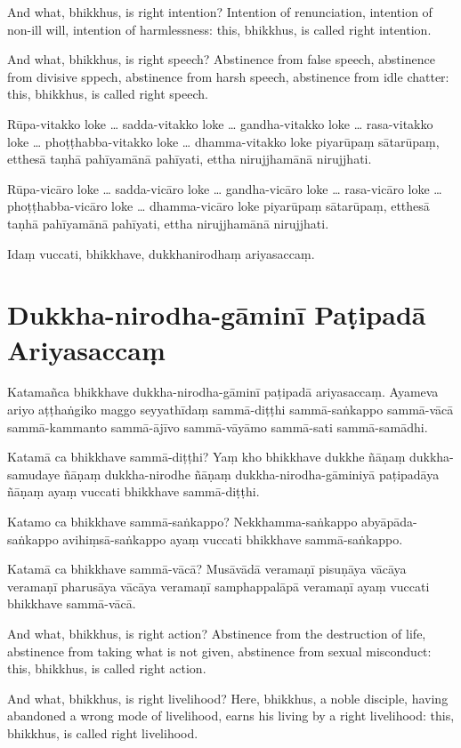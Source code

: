 And what, bhikkhus, is right intention? Intention of renunciation, intention of
non-ill will, intention of harmlessness: this, bhikkhus, is called right
intention.

And what, bhikkhus, is right speech? Abstinence from false speech, abstinence
from divisive sppech, abstinence from harsh speech, abstinence from idle
chatter: this, bhikkhus, is called right speech.

\paliPage

Rūpa-vitakko loke \ldots{} sadda-vitakko loke \ldots{} gandha-vitakko loke \ldots{}
rasa-vitakko loke \ldots{} phoṭṭhabba-vitakko loke \ldots{} dhamma-vitakko loke
piyarūpaṃ sātarūpaṃ, etthesā taṇhā pahīyamānā pahīyati, ettha nirujjhamānā
nirujjhati.

Rūpa-vicāro loke \ldots{} sadda-vicāro loke \ldots{} gandha-vicāro loke \ldots{}
rasa-vicāro loke \ldots{} phoṭṭhabba-vicāro loke \ldots{} dhamma-vicāro loke
piyarūpaṃ sātarūpaṃ, etthesā taṇhā pahīyamānā pahīyati, ettha nirujjhamānā
nirujjhati.

Idaṃ vuccati, bhikkhave, dukkhanirodhaṃ ariyasaccaṃ.

\section*{Dukkha-nirodha-gāminī Paṭipadā Ariyasaccaṃ}

Katamañca bhikkhave dukkha-nirodha-gāminī paṭipadā ariyasaccaṃ. Ayameva ariyo
aṭṭhaṅgiko maggo seyyathīdaṃ sammā-diṭṭhi sammā-saṅkappo sammā-vācā sammā-kammanto
sammā-ājīvo sammā-vāyāmo sammā-sati sammā-samādhi.

Katamā ca bhikkhave sammā-diṭṭhi? Yaṃ kho bhikkhave dukkhe ñāṇaṃ dukkha-samudaye
ñāṇaṃ dukkha-nirodhe ñāṇaṃ dukkha-nirodha-gāminiyā paṭipadāya ñāṇaṃ ayaṃ vuccati
bhikkhave sammā-diṭṭhi.

Katamo ca bhikkhave sammā-saṅkappo? Nekkhamma-saṅkappo abyāpāda-saṅkappo
avihiṃsā-saṅkappo ayaṃ vuccati bhikkhave sammā-saṅkappo.

Katamā ca bhikkhave sammā-vācā? Musāvādā veramaṇī pisuṇāya vācāya veramaṇī
pharusāya vācāya veramaṇī samphappalāpā veramaṇī ayaṃ vuccati bhikkhave
sammā-vācā.

\englishPage

And what, bhikkhus, is right action? Abstinence from the destruction of life,
abstinence from taking what is not given, abstinence from sexual misconduct:
this, bhikkhus, is called right action.

And what, bhikkhus, is right livelihood? Here, bhikkhus, a noble disciple,
having abandoned a wrong mode of livelihood, earns his living by a right
livelihood: this, bhikkhus, is called right livelihood.


